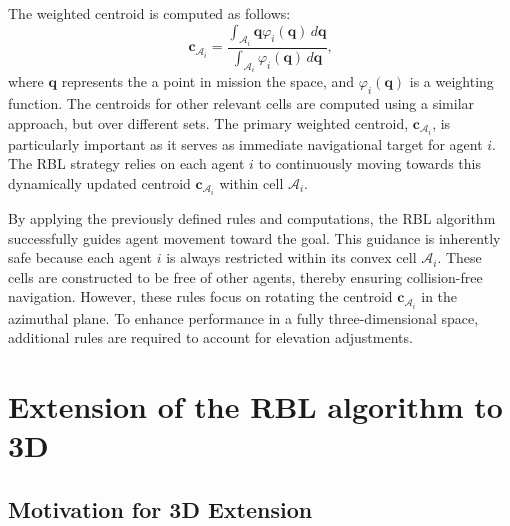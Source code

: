         The weighted centroid is computed as follows:        
        \begin{equation}
            \label{eqn:centroid_a}
            \mathbf{c}_{\mathcal{A}_i} = \frac{\int_{\mathcal{A}_i} \mathbf{q} \varphi_i(\mathbf{q}) \, d\mathbf{q}}{\int_{\mathcal{A}_i} \varphi_i(\mathbf{q}) \, d\mathbf{q}}\text{,}
        \end{equation}
        where \( \mathbf{q} \) represents the a point in mission the space, and \( \varphi_i(\mathbf{q}) \) is a weighting function. 
        The centroids for other relevant cells are computed using a similar approach, but over different sets.
        The primary weighted centroid, $\mathbf{c}_{\mathcal{A}_i}$, is particularly important as it serves as immediate navigational target for agent $i$.
        The \ac{RBL} strategy relies on each agent $i$ to continuously moving towards this dynamically updated centroid $\mathbf{c}_{\mathcal{A}_i}$ within cell $\mathcal{A}_i$.

        By applying the previously defined rules and computations, the \ac{RBL} algorithm successfully guides agent movement toward the goal.
        This guidance is inherently safe because each agent $i$ is always restricted within its convex cell $\mathcal{A}_i$.
        These cells are constructed to be free of other agents, thereby ensuring collision-free navigation.
        However, these rules focus on rotating the centroid $\mathbf{c}_{\mathcal{A}_i}$ in the azimuthal plane. 
        To enhance performance in a fully three-dimensional space, additional rules are required to account for elevation adjustments. 

\section{Extension of the RBL algorithm to 3D}
    \subsection{Motivation for 3D Extension}


